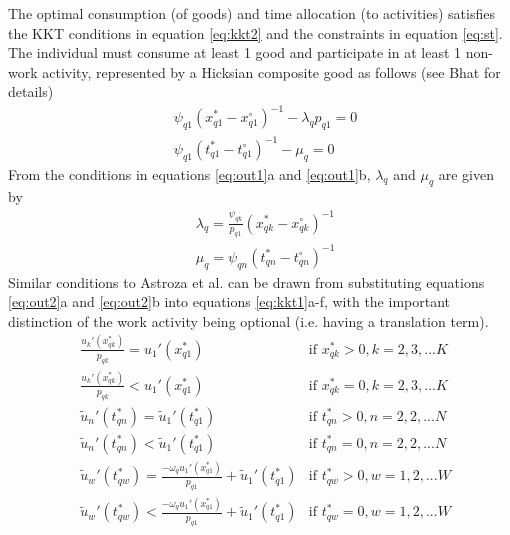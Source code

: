 The optimal consumption (of goods) and time allocation (to activities) satisfies the KKT conditions in equation \ref{eq:kkt2} and the constraints in equation \ref{eq:st}. The individual must consume at least 1 good and participate in at least 1 non-work activity, represented by a Hicksian composite good as follows (see Bhat \cite{Bhat2008TheExtensions} for details)
\begin{subequations}\label{eq:out1}
    \begin{align}
    &\psi_{q1}\left(x_{q1}^* - x_{q1}^\circ\right)^{-1} - \lambda_{q} p_{q1} = 0 \\
    &\psi_{q1}\left(t_{q1}^* - t_{q1}^\circ\right)^{-1} - \mu_{q} = 0 
    \end{align}
\end{subequations}
From the conditions in equations \ref{eq:out1}a and \ref{eq:out1}b, $\lambda_{q}$ and $\mu_q$ are given by
\begin{subequations}\label{eq:out2}
    \begin{align}
    &\lambda_{q} = \frac{\psi_{qk}}{p_{q1}}\left(x_{qk}^* - x_{qk}^\circ\right)^{-1} \\
    &\mu_{q} = \psi_{qn}\left(t_{qn}^* - t_{qn}^\circ\right)^{-1}
    \end{align}
\end{subequations}
Similar conditions to Astroza et al. \cite{Astroza2017AConsumption} can be drawn from substituting equations \ref{eq:out2}a and \ref{eq:out2}b into equations \ref{eq:kkt1}a-f, with the important distinction of the work activity being optional (i.e. having a translation term).
\begin{subequations}\label{eq:kkt3}
    \begin{align}
        &\frac{u_k'\left(x_{qk}^*\right)}{p_{qk}} = u_1'\left(x_{q1}^*\right) & \text{if } x_{qk}^* > 0,k=2,3,...K \\
        &\frac{u_k'\left(x_{qk}^*\right)}{p_{qk}} < u_1'\left(x_{q1}^*\right) & \text{if } x_{qk}^* = 0,k=2,3,...K \\
        &\widetilde{u}_n'\left(t_{qn}^*\right) = \widetilde{u}_1'\left(t_{q1}^*\right) & \text{if } t_{qn}^* > 0,n=2,2,...N \\
        &\widetilde{u}_n'\left(t_{qn}^*\right) < \widetilde{u}_1'\left(t_{q1}^*\right) & \text{if } t_{qn}^* = 0,n=2,2,...N \\
        &\widetilde{u}_w'\left(t_{qw}^*\right) = \frac{-\omega_q u_1'\left(x_{q1}^*\right)}{p_{q1}}  + \widetilde{u}_1'\left(t_{q1}^*\right) & \text{if } t_{qw}^* > 0,w=1,2,...W \\
        &\widetilde{u}_w'\left(t_{qw}^*\right) < \frac{-\omega_q u_1'\left(x_{q1}^*\right)}{p_{q1}}  + \widetilde{u}_1'\left(t_{q1}^*\right) & \text{if } t_{qw}^* = 0,w=1,2,...W
    \end{align}
\end{subequations}

